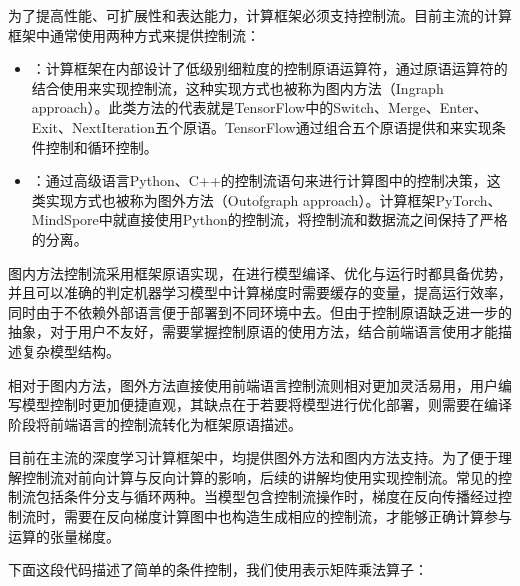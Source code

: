 \documentclass[letterpaper,10pt,english]{sphinxmanual}
\begin{document}
\sphinxAtStartPar
为了提高性能、可扩展性和表达能力，计算框架必须支持控制流。目前主流的计算框架中通常使用两种方式来提供控制流：
\begin{itemize}
\item {} 
\sphinxAtStartPar
{}：计算框架在内部设计了低级别细粒度的控制原语运算符，通过原语运算符的结合使用来实现控制流，这种实现方式也被称为图内方法（In\sphinxhyphen{}graph
approach）。此类方法的代表就是TensorFlow中的Switch、Merge、Enter、Exit、NextIteration五个原语。TensorFlow通过组合五个原语提供和来实现条件控制和循环控制。

\item {} 
\sphinxAtStartPar
{}：通过高级语言Python、C++的控制流语句来进行计算图中的控制决策，这类实现方式也被称为图外方法（Out\sphinxhyphen{}of\sphinxhyphen{}graph
approach）。计算框架PyTorch、MindSpore中就直接使用Python的控制流，将控制流和数据流之间保持了严格的分离。

\end{itemize}

\sphinxAtStartPar
图内方法控制流采用框架原语实现，在进行模型编译、优化与运行时都具备优势，并且可以准确的判定机器学习模型中计算梯度时需要缓存的变量，提高运行效率，同时由于不依赖外部语言便于部署到不同环境中去。但由于控制原语缺乏进一步的抽象，对于用户不友好，需要掌握控制原语的使用方法，结合前端语言使用才能描述复杂模型结构。

\sphinxAtStartPar
相对于图内方法，图外方法直接使用前端语言控制流则相对更加灵活易用，用户编写模型控制时更加便捷直观，其缺点在于若要将模型进行优化部署，则需要在编译阶段将前端语言的控制流转化为框架原语描述。

\sphinxAtStartPar
目前在主流的深度学习计算框架中，均提供图外方法和图内方法支持。为了便于理解控制流对前向计算与反向计算的影响，后续的讲解均使用实现控制流。常见的控制流包括条件分支与循环两种。当模型包含控制流操作时，梯度在反向传播经过控制流时，需要在反向梯度计算图中也构造生成相应的控制流，才能够正确计算参与运算的张量梯度。

\sphinxAtStartPar
下面这段代码描述了简单的条件控制，我们使用表示矩阵乘法算子：

\begin{sphinxVerbatim}[commandchars=\\\{\}]
      
     
           
           
     
\end{sphinxVerbatim}
\end{document}
